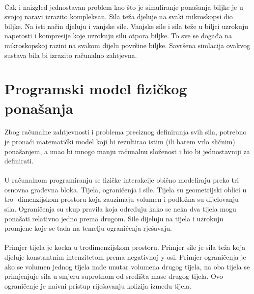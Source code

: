 \documentclass[times, utf8, diplomski]{fer}
\begin{document}
\paragraph{}
Čak i naizgled jednostavan problem kao što je simuliranje ponašanja biljke je u svojoj 
naravi izrazito kompleksan. Sila teža djeluje na svaki mikroskopsi dio biljke. Na isti način
djeluju i vanjske sile. Vanjske sile i sila teže u biljci uzrokuju napetosti i kompresije 
koje uzrokuju silu otpora biljke. To sve se događa na mikroskopskoj razini na svakom dijelu 
površine biljke. Savršena simlacija ovakvog sustava bila bi izrazito računalno zahtjevna.

\section{Programski model fizičkog ponašanja}
\paragraph{}
Zbog računalne zahtjevnosti i problema preciznog definiranja svih sila, potrebno je pronaći
matematički model koji bi rezultirao istim (ili barem vrlo sličnim) ponašanjem, a imao bi 
mnogo manju računalnu složenost i bio bi jednostavniji za definirati.

\paragraph{}
U računalnom programiranju se fizičke interakcije obično modeliraju preko tri osnovna  
građevna bloka. Tijela, ograničenja i sile. Tijela su geometrijski oblici u tro-
dimenzijskom prostoru koja zauzimaju volumen i podložna su dijelovanju sila. Ograničenja 
su skup pravila koja određuju kako se neka dva tijela mogu ponašati relativno jedno prema 
drugom. Sile dijeluju na tijela i uzrokuju promjene koje se tada na temelju ograničenja 
rješavaju.

\paragraph{}
Primjer tijela je kocka u trodimenzijskom prostoru. Primjer sile je sila teža koja djeluje 
konstantnim intenzitetom prema negativnoj y osi. Primjer ograničenja je ako se volumen 
jednog tijela nađe unutar volumena drugog tijela, na oba tijela se primjenjuje sila u smjeru 
suprotnom od središta mase drugog tijela. Ovo ograničenje je naivni pristup riješavanju 
kolizija između tijela.
\end{document}
